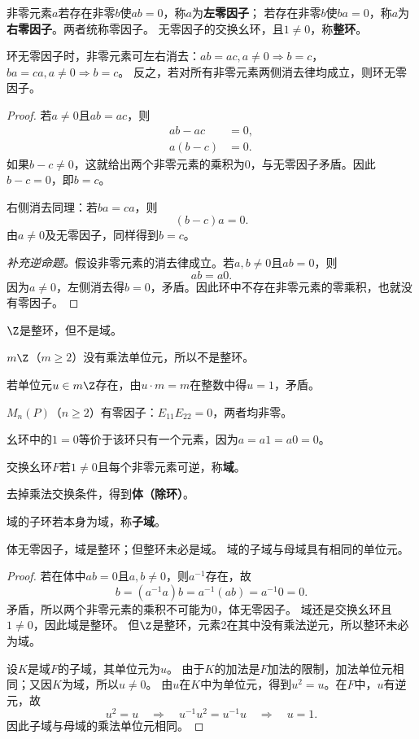 \begin{definition}
非零元素$a$若存在非零$b$使$ab=0$，称$a$为\textbf{左零因子}；
若存在非零$b$使$ba=0$，称$a$为\textbf{右零因子}。两者统称零因子。
无零因子的交换幺环，且$1\neq0$，称\textbf{整环}。
\end{definition}

\begin{proposition}
环无零因子时，非零元素可左右消去：$ab=ac,a\neq0\Rightarrow b=c$，$ba=ca,a\neq0\Rightarrow b=c$。
反之，若对所有非零元素两侧消去律均成立，则环无零因子。
\end{proposition}
\begin{proof}
若$a\neq0$且$ab=ac$，则
\[
\begin{aligned}
ab-ac&=0,\\
a(b-c)&=0.
\end{aligned}
\]
如果$b-c\neq0$，这就给出两个非零元素的乘积为0，与无零因子矛盾。因此$b-c=0$，即$b=c$。

右侧消去同理：若$ba=ca$，则
\[
(b-c)a=0.
\]
由$a\neq0$及无零因子，同样得到$b=c$。

\textit{补充逆命题。}假设非零元素的消去律成立。若$a,b\neq0$且$ab=0$，则
\[
ab=a0.
\]
因为$a\neq0$，左侧消去得$b=0$，矛盾。因此环中不存在非零元素的零乘积，也就没有零因子。
\end{proof}

\begin{example}

$\Z$是整环，但不是域。

$m\Z$（$m\geq2$）没有乘法单位元，所以不是整环。

若单位元$u\in m\Z$存在，由$u\cdot m=m$在整数中得$u=1$，矛盾。

$M_n(P)$（$n\geq2$）有零因子：$E_{11}E_{22}=0$，两者均非零。

幺环中的$1=0$等价于该环只有一个元素，因为$a=a1=a0=0$。
\end{example}

\begin{definition}

交换幺环$F$若$1\neq0$且每个非零元素可逆，称\textbf{域}。

去掉乘法交换条件，得到\textbf{体（除环）}。

域的子环若本身为域，称\textbf{子域}。
\end{definition}

\begin{proposition}
体无零因子，域是整环；但整环未必是域。
域的子域与母域具有相同的单位元。
\end{proposition}
\begin{proof}
若在体中$ab=0$且$a,b\neq0$，则$a^{-1}$存在，故
\[b=(a^{-1}a)b=a^{-1}(ab)=a^{-1}0=0.\]
矛盾，所以两个非零元素的乘积不可能为0，体无零因子。
域还是交换幺环且$1\neq0$，因此域是整环。
但$\Z$是整环，元素2在其中没有乘法逆元，所以整环未必为域。

设$K$是域$F$的子域，其单位元为$u$。
由于$K$的加法是$F$加法的限制，加法单位元相同；又因$K$为域，所以$u\neq0$。
由$u$在$K$中为单位元，得到$u^2=u$。在$F$中，$u$有逆元，故
\[
u^2=u
\quad\Longrightarrow\quad
u^{-1}u^2=u^{-1}u
\quad\Longrightarrow\quad
u=1.
\]
因此子域与母域的乘法单位元相同。
\end{proof}


